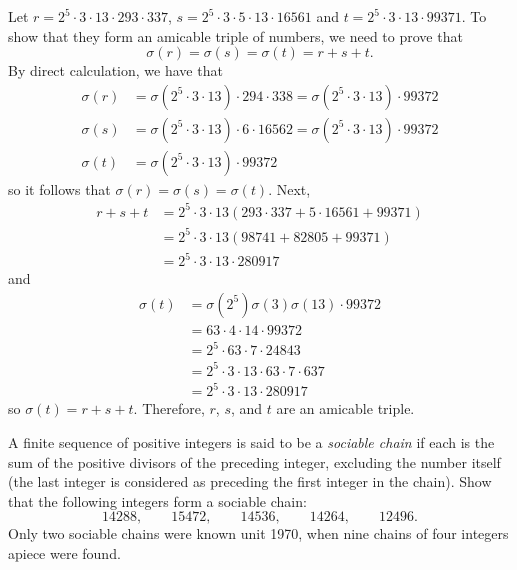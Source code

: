\begin{solution}
    Let $r = 2^5\cdot 3 \cdot 13 \cdot 293 \cdot 337$, $s = 2^5 \cdot 3 \cdot 5 \cdot 13 \cdot 16561$ and $t = 2^5 \cdot 3 \cdot 13 \cdot 99371$. To show that they form an amicable triple of numbers, we need to prove that
    $$\sigma(r) = \sigma(s) = \sigma(t) = r + s + t.$$
    By direct calculation, we have that
    \begin{align*}
        \sigma(r) &= \sigma(2^5 \cdot 3 \cdot 13)\cdot 294\cdot 338 = \sigma(2^5 \cdot 3 \cdot 13) \cdot 99372 \\
        \sigma(s) &= \sigma(2^5 \cdot 3 \cdot 13)\cdot 6\cdot 16562 = \sigma(2^5 \cdot 3 \cdot 13) \cdot 99372 \\
        \sigma(t) &= \sigma(2^5 \cdot 3 \cdot 13) \cdot 99372
    \end{align*}
    so it follows that $\sigma(r) = \sigma(s) = \sigma(t)$. Next,
    \begin{align*}
        r + s + t &= 2^5 \cdot 3 \cdot 13 ( 293 \cdot 337 + 5\cdot 16561 + 99371) \\
        &= 2^5 \cdot 3 \cdot 13 (98741 + 82805 + 99371) \\
        &= 2^5 \cdot 3 \cdot 13 \cdot 280917
    \end{align*}
    and 
    \begin{align*}
        \sigma(t) &= \sigma(2^5)\sigma(3)\sigma(13)\cdot 99372 \\
        &= 63 \cdot 4 \cdot 14 \cdot 99372 \\
        &= 2^5 \cdot 63 \cdot 7 \cdot 24843 \\
        &= 2^5 \cdot 3 \cdot 13 \cdot 63 \cdot 7 \cdot 637 \\
        &= 2^5 \cdot 3 \cdot 13 \cdot 280917
    \end{align*}
    so $\sigma(t) = r + s + t$. Therefore, $r$, $s$, and $t$ are an amicable triple. \\
\end{solution}

\begin{exercise}
    A finite sequence of positive integers is said to be a \textit{sociable chain} if each is the sum of the positive divisors of the preceding integer, excluding the number itself (the last integer is considered as preceding the first integer in the chain). Show that the following integers form a sociable chain:
    $$14288, \qquad 15472, \qquad 14536, \qquad 14264, \qquad 12496.$$
    Only two sociable chains were known unit 1970, when nine chains of four integers apiece were found. \\
\end{exercise}

